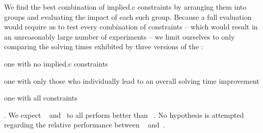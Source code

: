 We find the best combination of \gls{implied.c} \glspl{constraint} by arranging
them into groups and evaluating the impact of each such group.
%
Because a full evaluation would require us to test every combination of
\glspl{constraint} -- which would result in an unreasonably large number of
experiments -- we limit ourselves to only comparing the solving times exhibited
by three versions of the :
%
\begin{modelList}
  \item {}
    one with no \gls{implied.c} \glspl{constraint}
  \item {}
    one with only those who individually lead to an overall solving time
    improvement
  \item {}
    one with all \glspl{constraint}
\end{modelList}.
%
We expect ~
and~ to all perform better than
~.
%
No hypothesis is attempted regarding the relative performance between
~
and~.

